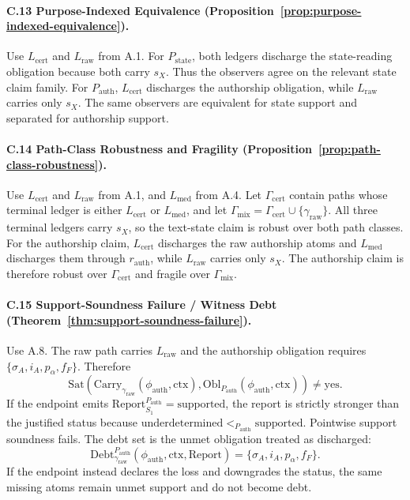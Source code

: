 \documentclass[11pt,twoside]{article}
\theoremstyle{definition}
\newcommand{\Obl}{\mathrm{Obl}}
\newcommand{\Carry}{\mathrm{Carry}}
\newcommand{\Debt}{\mathrm{Debt}}
\newcommand{\Sat}{\mathrm{Sat}}
\newcommand{\Report}{\mathrm{Report}}
\newcommand{\ctx}{\mathrm{ctx}}
\newcommand{\supported}{\mathrm{supported}}
\newcommand{\underdetermined}{\mathrm{underdetermined}}
\begin{document}
\paragraph{C.13 Purpose-Indexed Equivalence (Proposition~\ref{prop:purpose-indexed-equivalence}).}
Use $L_{\mathrm{cert}}$ and $L_{\mathrm{raw}}$ from A.1. For
$P_{\mathrm{state}}$, both ledgers discharge the state-reading obligation
because both carry $s_X$. Thus the observers agree on the relevant state claim
family. For $P_{\mathrm{auth}}$, $L_{\mathrm{cert}}$ discharges the authorship
obligation, while $L_{\mathrm{raw}}$ carries only $s_X$. The same observers are
equivalent for state support and separated for authorship support.

\paragraph{C.14 Path-Class Robustness and Fragility (Proposition~\ref{prop:path-class-robustness}).}
Use $L_{\mathrm{cert}}$ and $L_{\mathrm{raw}}$ from A.1, and
$L_{\mathrm{med}}$ from A.4.
Let $\Gamma_{\mathrm{cert}}$ contain paths whose terminal ledger is either
$L_{\mathrm{cert}}$ or $L_{\mathrm{med}}$, and let
$\Gamma_{\mathrm{mix}}=\Gamma_{\mathrm{cert}}\cup\{\gamma_{\mathrm{raw}}\}$.
All three terminal ledgers carry $s_X$, so the text-state claim is robust over
both path classes. For the authorship claim, $L_{\mathrm{cert}}$ discharges the
raw authorship atoms and $L_{\mathrm{med}}$ discharges them through
$r_{\mathrm{auth}}$, while $L_{\mathrm{raw}}$ carries only $s_X$. The
authorship claim is therefore robust over $\Gamma_{\mathrm{cert}}$ and fragile
over $\Gamma_{\mathrm{mix}}$.

\paragraph{C.15 Support-Soundness Failure / Witness Debt (Theorem~\ref{thm:support-soundness-failure}).}
Use A.8. The raw path carries $L_{\mathrm{raw}}$ and the authorship obligation
requires $\{\sigma_A,i_A,p_\alpha,f_F\}$. Therefore
\[
  \Sat(\Carry_{\gamma_{\mathrm{raw}}}(\phi_{\mathrm{auth}},\ctx),
       \Obl_{P_{\mathrm{auth}}}(\phi_{\mathrm{auth}},\ctx))
  \neq \mathrm{yes}.
\]
If the endpoint emits $\Report_{S_1}^{P_{\mathrm{auth}}}=\supported$, the
report is strictly stronger than the justified status because
$\underdetermined<_{P_{\mathrm{auth}}}\supported$. Pointwise support soundness
fails. The debt set is the unmet obligation treated as discharged:
\[
  \Debt_{\gamma_{\mathrm{raw}}}^{P_{\mathrm{auth}}}
  (\phi_{\mathrm{auth}},\ctx,\Report)
  =
  \{\sigma_A,i_A,p_\alpha,f_F\}.
\]
If the endpoint instead declares the loss and downgrades the status, the same
missing atoms remain unmet support and do not become debt.
\end{document}
